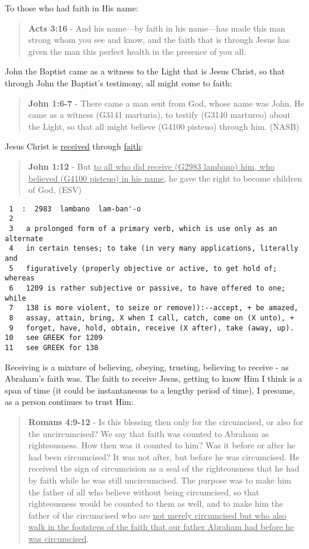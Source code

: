 \documentclass[11pt]{article}
\begin{document}
To those who had faith in His name:

\begin{quote}
\textbf{Acts 3:16} - And his name—by faith in his name—has made this man strong whom you see and know, and the faith that is through Jesus has given the man this perfect health in the presence of you all.
\end{quote}

John the Baptist came as a witness to the Light that is Jesus Christ, so that through John the Baptist's testimony, all might come to faith:

\begin{quote}
\textbf{John 1:6-7} - There came a man sent from God, whose name was John. He came as a witness (G3141 marturia), to testify (G3140 martureo) about the Light, so that all might believe (G4100 pisteuo) through him. (NASB)
\end{quote}

Jesus Christ is \uline{received} through \uline{faith}:

\begin{quote}
\textbf{John 1:12} - But \uline{to all who did receive (G2983 lambano) him, who believed (G4100 pisteuo) in his name,} he gave the right to become children of God, (ESV)
\end{quote}

\begin{verbatim}
 1  :  2983  lambano  lam-ban'-o
 2  
 3   a prolonged form of a primary verb, which is use only as an alternate
 4   in certain tenses; to take (in very many applications, literally and
 5   figuratively (properly objective or active, to get hold of; whereas
 6   1209 is rather subjective or passive, to have offered to one; while
 7   138 is more violent, to seize or remove)):--accept, + be amazed,
 8   assay, attain, bring, X when I call, catch, come on (X unto), +
 9   forget, have, hold, obtain, receive (X after), take (away, up).
10   see GREEK for 1209
11   see GREEK for 138
\end{verbatim}

Receiving is a mixture of believing, obeying, trusting, believing to receive - as Abraham's faith was. The faith to receive Jesus, getting to know Him I think is a span of time (it could be instantaneous to a lengthy period of time), I presume, as a person continues to trust Him:

\begin{quote}
\textbf{Romans 4:9-12} - Is this blessing then only for the circumcised, or also for the uncircumcised? We say that faith was counted to Abraham as righteousness. How then was it counted to him? Was it before or after he had been circumcised? It was not after, but before he was circumcised. He received the sign of circumcision as a seal of the righteousness that he had by faith while he was still uncircumcised. The purpose was to make him the father of all who believe without being circumcised, so that righteousness would be counted to them as well, and to make him the father of the circumcised who are \uline{not merely circumcised but who also walk in the footsteps of the faith that our father Abraham had before he was circumcised}.
\end{quote}
\end{document}
